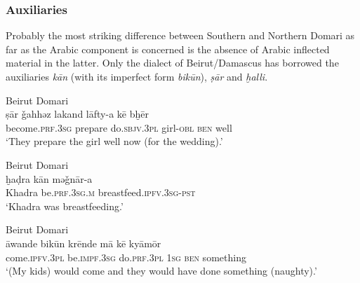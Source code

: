 \documentclass[output=paper]{langsci/langscibook}
\begin{document}
 \subsubsection{Auxiliaries}

Probably the most striking difference between Southern and Northern Domari as far as the Arabic component is concerned is the absence of Arabic inflected material in the latter. Only the dialect of Beirut/Damascus has borrowed the auxiliaries \textit{kān} (with its imperfect form \textit{bikūn}), \textit{ṣār} and \textit{ḫalli}.

\ea
{Beirut Domari}\\ \label{sar}
\gll ṣār \v{g}ahhəz lakand lāfty-a kē bḫēr\\
     become.\textsc{prf.3sg} prepare do\textsc{.sbjv.3pl} girl\textsc{{}-obl} \textsc{ben} well\\
\glt ‘They prepare the girl well now (for the wedding).’
\z

\ea\label{ex:key:} \label{xadra}
{Beirut Domari}\\
\gll ḫaḍra kān mə\v{g}nār-a\\
     Khadra be.\textsc{prf.3sg.m} breastfeed.\textsc{ipfv.3sg-pst}\\
\glt ‘Khadra was breastfeeding.’
\z

\ea\label{ex:key:} \label{awande}
{Beirut Domari}\\
\gll āwande bikūn krēnde mā kē kyāmōr\\
     come.\textsc{ipfv.3pl} be.\textsc{impf.3sg} do.\textsc{prf.3pl} \textsc{1sg} \textsc{ben} something\\
\glt ‘(My kids) would come and they would have done something (naughty).’ 
\z
\end{document}
